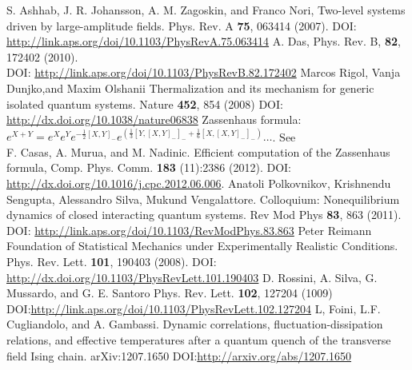 \documentclass[a4paper,10pt]{article}
\begin{document}
\begin{thebibliography}{10}
\newblock S. Ashhab, J. R. Johansson, A. M. Zagoskin, and Franco Nori,
\newblock Two-level systems driven by large-amplitude fields.
\newblock Phys. Rev. A {\bf 75}, 063414 (2007).
\newblock DOI: \url{http://link.aps.org/doi/10.1103/PhysRevA.75.063414}
\newblock A. Das, Phys. Rev. B, {\bf 82}, 172402 (2010).\\
\newblock DOI: \url{http://link.aps.org/doi/10.1103/PhysRevB.82.172402}
\newblock Marcos Rigol, Vanja Dunjko,and Maxim Olshanii
\newblock Thermalization and its mechanism for generic isolated quantum systems.
\newblock Nature {\bf 452}, 854 (2008)
\newblock DOI: \url{http://dx.doi.org/10.1038/nature06838}
\newblock Zassenhaus formula: $e^{X+Y}=e^X e^Y e^{-\frac{1}{2}\left[X,Y\right]_-} e^{\left(\frac{1}{3}\left[Y,\left[X,Y\right]_-\right]_-+\frac{1}{6}\left[X,\left[X,Y\right]_-\right]_-\right)}\dots$. See\\
\newblock F. Casas, A. Murua, and M. Nadinic.
\newblock Efficient computation of the Zassenhaus formula,
\newblock Comp. Phys. Comm. {\bf 183} (11):2386 (2012).
\newblock DOI: \url{http://dx.doi.org/10.1016/j.cpc.2012.06.006}.
\newblock Anatoli Polkovnikov, Krishnendu Sengupta, Alessandro Silva, Mukund Vengalattore.
\newblock Colloquium: Nonequilibrium dynamics of closed interacting quantum systems.
\newblock Rev Mod Phys {\bf 83}, 863 (2011).
\newblock DOI: \url{http://link.aps.org/doi/10.1103/RevModPhys.83.863}
\newblock Peter Reimann
\newblock Foundation of Statistical Mechanics under Experimentally Realistic Conditions.
\newblock Phys. Rev. Lett. {\bf 101}, 190403 (2008).
\newblock DOI: \url{http://dx.doi.org/10.1103/PhysRevLett.101.190403}
\newblock D. Rossini, A. Silva, G. Mussardo, and G. E. Santoro
\newblock Phys. Rev. Lett. {\bf 102}, 127204 (1009)
\newblock DOI:\url{http://link.aps.org/doi/10.1103/PhysRevLett.102.127204}
\newblock L, Foini, L.F. Cugliandolo, and A. Gambassi.
\newblock Dynamic correlations, fluctuation-dissipation relations, and effective temperatures after a quantum quench of the transverse field Ising chain.
\newblock arXiv:1207.1650
\newblock DOI:\url{http://arxiv.org/abs/1207.1650}
\end{thebibliography}
\end{document}
